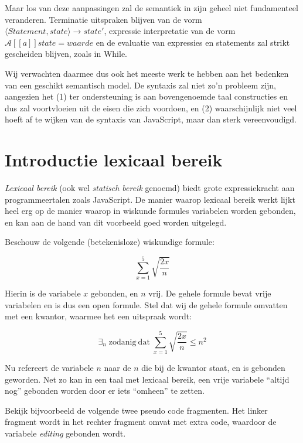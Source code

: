 \documentclass[a4paper,11pt]{article}
\begin{document}
Maar los van deze aanpassingen zal de semantiek in zijn geheel niet fundamenteel veranderen. Terminatie uitspraken blijven van de vorm $\langle \mathit{Statement}, \mathit{state}\rangle \longrightarrow \mathit{state}'$, expressie interpretatie van de vorm $\mathcal{A}{[\![a]\!]}\mathit{state} = \mathit{waarde}$ en de evaluatie van expressies en statements zal strikt gescheiden blijven, zoals in While.

Wij verwachten daarmee dus ook het meeste werk te hebben aan het bedenken van een geschikt semantisch model. De syntaxis zal niet zo'n probleem zijn, aangezien het (1) ter ondersteuning is aan bovengenoemde taal constructies en dus zal voortvloeien uit de eisen die zich voordoen, en (2) waarschijnlijk niet veel hoeft af te wijken van de syntaxis van JavaScript, maar dan sterk vereenvoudigd.

\section*{Introductie lexicaal bereik}

\emph{Lexicaal bereik} (ook wel \emph{statisch bereik} genoemd) biedt grote expressiekracht aan programmeertalen zoals JavaScript. De manier waarop lexicaal bereik werkt lijkt heel erg op de manier waarop in wiskunde formules variabelen worden gebonden, en kan aan de hand van dit voorbeeld goed worden uitgelegd.

Beschouw de volgende (betekenisloze) wiskundige formule:

\begin{equation*}
	\sum_{x=1}^5{\sqrt{\frac{2x}{n}}}
\end{equation*}

Hierin is de variabele $x$ gebonden, en $n$ vrij. De gehele formule bevat vrije variabelen en is dus een open formule. Stel dat wij de gehele formule omvatten met een kwantor, waarmee het een uitspraak wordt:

\begin{equation*}
	\exists_n\; \mathrm{zodanig~dat}\;
	\sum_{x=1}^5{\sqrt{\frac{2x}{n}}}
	\le n^2
\end{equation*}

Nu refereert de variabele $n$ naar de $n$ die bij de kwantor staat, en is gebonden geworden. Net zo kan in een taal met lexicaal bereik, een vrije variabele “altijd nog” gebonden worden door er iets “omheen” te zetten.

Bekijk bijvoorbeeld de volgende twee pseudo code fragmenten. Het linker fragment wordt in het rechter fragment omvat met extra code, waardoor de variabele \textit{editing} gebonden wordt.
\end{document}
